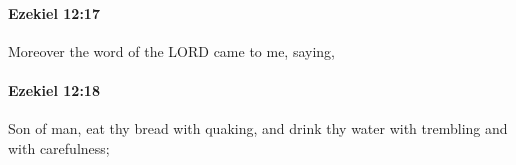 		\paragraph{Ezekiel 12:17} %
			\label{EZEKIEL-12-17}

			Moreover the word of the LORD came to me, saying,


		\paragraph{Ezekiel 12:18} %
			\label{EZEKIEL-12-18}

			Son of man, eat thy bread with quaking, and drink thy water with trembling and with carefulness;


